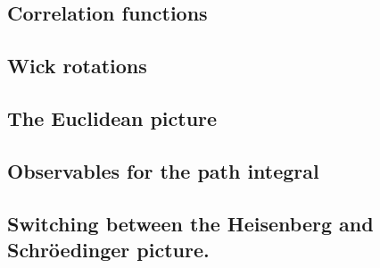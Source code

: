 \subsection{Correlation functions}

\subsection{Wick rotations} %

\subsection{The Euclidean picture}

\subsection{Observables for the path integral}

\subsection{Switching between the Heisenberg and Schröedinger picture.}





